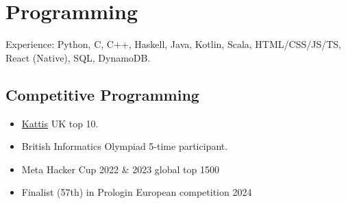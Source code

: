 \documentclass{Resume}
\begin{document}
   			


		\newpage
	\section{Programming}
		Experience: Python, C, C++, Haskell, Java, Kotlin, Scala, HTML/CSS/JS/TS, React (Native), SQL, DynamoDB.
   
		\subsection{Competitive Programming}
			\begin{itemize}
    			    \item \href{https://open.kattis.com/countries/GBR}{Kattis} UK top 10.
    			    \item British Informatics Olympiad 5-time participant.
    			    \item Meta Hacker Cup 2022 \& 2023 global top 1500
                    \item Finalist (57th) in Prologin European competition 2024 
			\end{itemize}
\end{document}

